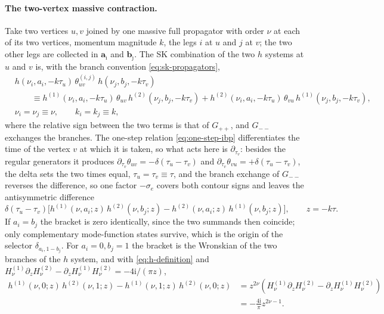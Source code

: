 \documentclass[11pt,a4paper]{article}
\numberwithin{table}{section}
\newcommand{\nn}{\nonumber}
\newcommand{\ii}{\mathrm i}
\def\ie{\begin{equation}\begin{aligned}}
\def\fe{\end{aligned}\end{equation}}
\begin{document}
\paragraph{The two-vertex massive contraction.}
Take two vertices $u,v$ joined by one massive full propagator with order $\nu$ at each of its two vertices, momentum
magnitude $k$, the legs $i$ at $u$ and $j$ at $v$; the two other legs are collected in
$\bm a_{\hat\imath}$ and $\bm b_{\hat\jmath}$. The SK combination of the two $h$ systems at $u$ and $v$ is,
with the branch convention \eqref{eq:sk-propagators},
\ie
&h(\nu_{i},a_i,-k\tau_u)\,\theta^{(i,j)}_{uv}\,h(\nu_{j},b_j,-k\tau_v)
\nn\\
&\qquad\equiv
h^{(1)}(\nu_{i},a_i,-k\tau_u)\,\theta_{uv}\,h^{(2)}(\nu_{j},b_j,-k\tau_v)
+h^{(2)}(\nu_{i},a_i,-k\tau_u)\,\theta_{vu}\,h^{(1)}(\nu_{j},b_j,-k\tau_v),
\nn\\
&\nu_{i}=\nu_{j}\equiv\nu, \qquad k_{i}=k_{j}\equiv k,
\fe
where the relative sign between the two terms is that of $G_{++}$, and $G_{--}$ exchanges the
branches. The one-step relation \eqref{eq:one-step-ibp} differentiates the time of the vertex $v$ at
which it is taken, so what acts here is $\partial_{\tau_v}$: besides the regular generators it
produces $\partial_{\tau_v}\theta_{uv}=-\delta(\tau_u-\tau_v)$ and
$\partial_{\tau_v}\theta_{vu}=+\delta(\tau_u-\tau_v)$, the delta sets the two times equal,
$\tau_u=\tau_v\equiv\tau$, and the branch exchange of $G_{--}$ reverses the difference, so one factor
$-\sigma_e$ covers both contour signs and leaves the antisymmetric difference
\begin{equation}
  \delta(\tau_u-\tau_v)\Big[
  h^{(1)}(\nu,a_i;z)\,h^{(2)}(\nu,b_j;z)
  -h^{(2)}(\nu,a_i;z)\,h^{(1)}(\nu,b_j;z)\Big],
  \qquad z=-k\tau .
  \label{eq:R-antisym}
\end{equation}
If $a_i=b_j$ the bracket is zero identically, since the two summands then coincide; only
complementary mode-function states survive, which is the origin of the selector $\delta_{a_i,1-b_j}$. For
$a_i=0,b_j=1$ the bracket is the Wronskian of the two branches of the $h$ system, and with
\eqref{eq:h-definition} and $H^{(1)}_\nu\partial_zH^{(2)}_\nu-\partial_zH^{(1)}_\nu H^{(2)}_\nu
=-4\ii/(\pi z)$,
\begin{equation}
  \begin{aligned}
  h^{(1)}(\nu,0;z)\,h^{(2)}(\nu,1;z)-h^{(1)}(\nu,1;z)\,h^{(2)}(\nu,0;z)
  &=z^{2\nu}\left(H^{(1)}_\nu\partial_zH^{(2)}_\nu-\partial_zH^{(1)}_\nu H^{(2)}_\nu\right)\\
  &=-\frac{4\ii}{\pi}z^{2\nu-1}.
  \end{aligned}
  \label{eq:wronskian-h}
\end{equation}
\end{document}
